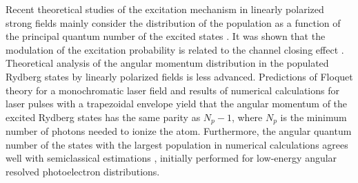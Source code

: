 Recent theoretical studies of the excitation mechanism in linearly polarized strong fields mainly consider the distribution of the population as a function of the principal quantum number of the excited states \cite{li2014,li2014b,zimmermann2017,xiong2017,piraux2017}. It was shown that the modulation of the excitation probability is related to the channel closing effect \cite{krajewska2012,li2014,li2014b,piraux2017}. 
Theoretical analysis of the angular momentum distribution in the populated Rydberg states by linearly polarized fields is less advanced. Predictions of Floquet theory for a monochromatic laser field \cite{krajewska2012} and results of numerical calculations for laser pulses with a trapezoidal envelope \cite{piraux2017} yield that the angular momentum of the excited Rydberg states has the same parity as $N_p-1$, where $N_p$ is the minimum number of photons needed to ionize the atom. Furthermore, the angular quantum number of the states with the largest population in numerical calculations \cite{li2014,li2014b,piraux2017} agrees well with semiclassical estimations \cite{arbo2008}, initially performed for low-energy angular resolved photoelectron distributions.

